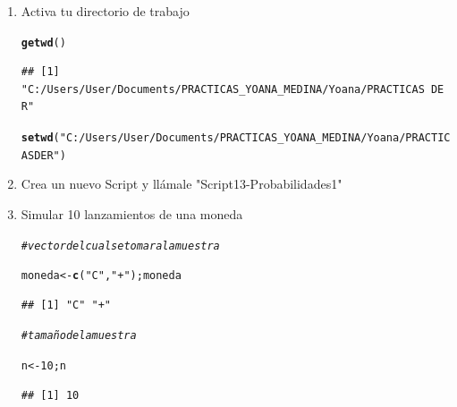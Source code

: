 \documentclass[12pt,letterpaper]{article}\usepackage[]{graphicx}\usepackage[]{color}
\makeatletter
\newcommand{\hlnum}[1]{\textcolor[rgb]{0.686,0.059,0.569}{#1}}%
\newcommand{\hlstr}[1]{\textcolor[rgb]{0.192,0.494,0.8}{#1}}%
\newcommand{\hlcom}[1]{\textcolor[rgb]{0.678,0.584,0.686}{\textit{#1}}}%
\newcommand{\hlstd}[1]{\textcolor[rgb]{0.345,0.345,0.345}{#1}}%
\newcommand{\hlkwb}[1]{\textcolor[rgb]{0.69,0.353,0.396}{#1}}%
\newcommand{\hlkwd}[1]{\textcolor[rgb]{0.737,0.353,0.396}{\textbf{#1}}}%
\newenvironment{kframe}{%
 \def\at@end@of@kframe{}%
 \ifinner\ifhmode%
  \def\at@end@of@kframe{\end{minipage}}%
  \begin{minipage}{\columnwidth}%
 \fi\fi%
 \def\FrameCommand##1{\hskip\@totalleftmargin \hskip-\fboxsep
 \colorbox{shadecolor}{##1}\hskip-\fboxsep
     \hskip-\linewidth \hskip-\@totalleftmargin \hskip\columnwidth}%
 \MakeFramed {\advance\hsize-\width
   \@totalleftmargin\z@ \linewidth\hsize
   \@setminipage}}%
 {\par\unskip\endMakeFramed%
 \at@end@of@kframe}
\newenvironment{knitrout}{}{} %
\makeatother
\begin{document}
\begin{enumerate}
\item  Activa tu directorio de trabajo

\begin{knitrout}
\color{fgcolor}\begin{kframe}
\begin{alltt}
\hlkwd{getwd}\hlstd{()}
\end{alltt}
\begin{verbatim}
## [1] "C:/Users/User/Documents/PRACTICAS_YOANA_MEDINA/Yoana/PRACTICAS DE R"
\end{verbatim}
\begin{alltt}
\hlkwd{setwd}\hlstd{(}\hlstr{"C:/Users/User/Documents/PRACTICAS_YOANA_MEDINA/Yoana/PRACTICAS DE R"}\hlstd{)}
\end{alltt}
\end{kframe}
\end{knitrout}

\item  Crea un nuevo Script y ll\'amale "Script13-Probabilidades1"

\item Simular 10 lanzamientos de una moneda

\begin{knitrout}
\color{fgcolor}\begin{kframe}
\begin{alltt}
\hlcom{# vector del cual se tomara la muestra}

\hlstd{moneda} \hlkwb{<-} \hlkwd{c}\hlstd{(}\hlstr{"C"}\hlstd{,} \hlstr{"+"}\hlstd{); moneda}
\end{alltt}
\begin{verbatim}
## [1] "C" "+"
\end{verbatim}
\end{kframe}
\end{knitrout}

\begin{knitrout}
\color{fgcolor}\begin{kframe}
\begin{alltt}
\hlcom{# tamaño de la muestra }

\hlstd{n} \hlkwb{<-} \hlnum{10}\hlstd{; n}
\end{alltt}
\begin{verbatim}
## [1] 10
\end{verbatim}
\end{kframe}
\end{knitrout}


\end{enumerate}
\end{document}
